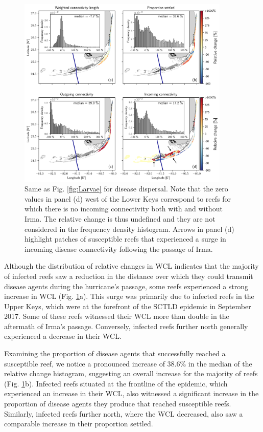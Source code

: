 \documentclass[fleqn,10pt]{wlscirep}
\newcommand{\modif}[1]{{#1}}
\begin{document}
\begin{figure}[tbp]
    \centering
    \includegraphics[width=0.9\textwidth]{figures/fig_connex_sctld_b.png}
    \caption{Same as Fig. \ref{fig:Larvae} for disease dispersal. Note that the zero values in panel (d) west of the Lower Keys correspond to reefs for which there is no incoming connectivity both with and without Irma. The relative change is thus undefined and they are not considered in the frequency density histogram. Arrows in panel (d) highlight patches of susceptible reefs that experienced a surge in incoming disease connectivity following the passage of Irma. }
    \label{fig:SCTLD}
\end{figure}

Although the distribution of relative changes in WCL indicates that the majority of infected reefs saw a reduction in the distance over which they could transmit disease agents during the hurricane's passage, some reefs experienced a strong increase in WCL (Fig. \ref{fig:SCTLD}a). This surge was primarily due to infected reefs in the Upper Keys, which were at the forefront of the SCTLD epidemic in September 2017. Some of these reefs witnessed their WCL more than double in the aftermath of Irma's passage. Conversely, infected reefs further north generally experienced a decrease in their WCL.

Examining the proportion of disease agents that successfully reached a susceptible reef, we notice a pronounced increase \modif{of 38.6\%} in the median of the relative change histogram, suggesting \modif{an overall} increase for the majority of reefs (Fig. \ref{fig:SCTLD}b). Infected reefs situated at the frontline of the epidemic, which experienced an increase in their WCL, also witnessed a significant increase in the proportion of disease agents they produce that reached susceptible reefs. Similarly, infected reefs further north, where the WCL decreased, also saw a comparable increase in their proportion settled.
\end{document}
